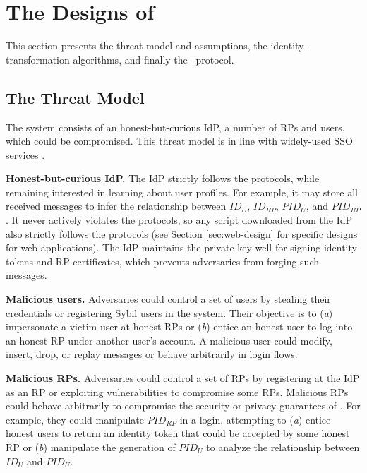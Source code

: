 \section{The Designs of \usso}
\label{sec:UPPRESSO}

This section presents the threat model and assumptions, the identity-transformation algorithms, and finally the \usso\ protocol.

\subsection{The Threat Model}
\label{subsec:threatmodel}
The system consists of an honest-but-curious IdP,
 a number of RPs and users, which could be compromised. %
This threat model is in line with widely-used SSO services \cite{OpenIDConnect,rfc6749, SAML, SAMLIdentifier}.

\noindent \textbf{Honest-but-curious IdP.} The IdP strictly follows the protocols,
 while remaining interested in learning about user profiles.
For example, it may store all received messages to infer the relationship between $ID_U$, $ID_{RP}$, $PID_{U}$, and $PID_{RP}$.
It never actively violates the protocols, so any script downloaded from the IdP also strictly follows the protocols (see Section \ref{sec:web-design} for specific designs for web applications).
The IdP maintains the private key well for signing identity tokens and RP certificates, %
which prevents adversaries from forging such messages.

\noindent \textbf{Malicious users.} Adversaries could control a set of users by stealing their credentials or registering Sybil users in the system.
 Their objective is to (\emph{a}) impersonate a victim user at honest RPs or (\emph{b}) entice an honest user to log into an honest RP under another user's account.
A malicious user could modify, insert, drop, or replay messages or behave arbitrarily in login flows.

\noindent \textbf{Malicious RPs.}
Adversaries could control a set of RPs by registering at the IdP as an RP or exploiting vulnerabilities to compromise some RPs. Malicious RPs could behave arbitrarily to compromise the security or privacy guarantees of \usso.
For example, they could manipulate $PID_{RP}$ in a login, attempting to (\emph{a}) entice honest users to return an identity token that could be accepted by some honest RP or (\emph{b}) manipulate the generation of $PID_U$ to analyze the relationship between $ID_U$ and $PID_U$.

